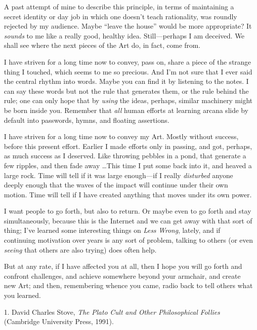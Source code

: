 {
 A past attempt of mine to describe this principle, in terms of
maintaining a secret identity or day job in which one
doesn't teach rationality, was roundly rejected by my
audience. Maybe ``leave the house''
would be more appropriate? It \textit{sounds} to me like a really good,
healthy idea. Still---perhaps I am deceived. We shall see where the
next pieces of the Art do, in fact, come from.}

{
 I have striven for a long time now to convey, pass on, share a
piece of the strange thing I touched, which seems to me so precious.
And I'm not sure that I ever said the central rhythm
into words. Maybe you can find it by listening to the notes. I can say
these words but not the rule that generates them, or the rule behind
the rule; one can only hope that by \textit{using} the ideas, perhaps,
similar machinery might be born inside you. Remember that \textit{all}
human efforts at learning arcana slide by default into passwords,
hymns, and floating assertions.}

{
 I have striven for a long time now to convey my Art. Mostly
without success, before this present effort. Earlier I made efforts
only in passing, and got, perhaps, as much success as I deserved. Like
throwing pebbles in a pond, that generate a few ripples, and then fade
away \ldots This time I put some back into it, and heaved a large rock.
Time will tell if it was large enough---if I really \textit{disturbed}
anyone deeply enough that the waves of the impact will continue under
their own motion. Time will tell if I have created anything that moves
under its own power.}

{
 I want people to go forth, but also to return. Or maybe even to go
forth and stay simultaneously, because this is the Internet and we can
get away with that sort of thing; I've learned some
interesting things on \textit{Less Wrong}, lately, and if continuing
motivation over years is any sort of problem, talking to others (or
even \textit{seeing} that others are also trying) does often help.}

{
 But at any rate, if I have affected you at all, then I hope you
will go forth and confront challenges, and achieve somewhere beyond
your armchair, and create new Art; and then, remembering whence you
came, radio back to tell others what you learned.}

\myendsectiontext


\bigskip

{
 1. David Charles Stove, \textit{The Plato Cult and Other
Philosophical Follies} (Cambridge University Press, 1991).}


